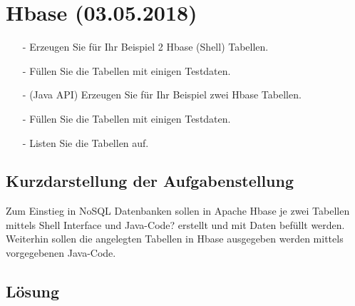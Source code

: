 \section{Hbase (03.05.2018)}
\begin{itemize}
\item[-] Erzeugen Sie für Ihr Beispiel 2 Hbase (Shell) Tabellen.
\item[-] Füllen Sie die Tabellen mit einigen Testdaten.
\item[-] (Java API) Erzeugen Sie für Ihr Beispiel zwei Hbase Tabellen.
\item[-] Füllen Sie die Tabellen mit einigen Testdaten.
\item[-] Listen Sie die Tabellen auf.
\end{itemize}
\subsection*{Kurzdarstellung der Aufgabenstellung}
Zum Einstieg in NoSQL Datenbanken sollen in Apache Hbase je zwei Tabellen mittels Shell Interface und Java-Code? erstellt und mit Daten befüllt werden. Weiterhin sollen die angelegten Tabellen in Hbase ausgegeben werden mittels vorgegebenen Java-Code.
\subsection*{Lösung}

